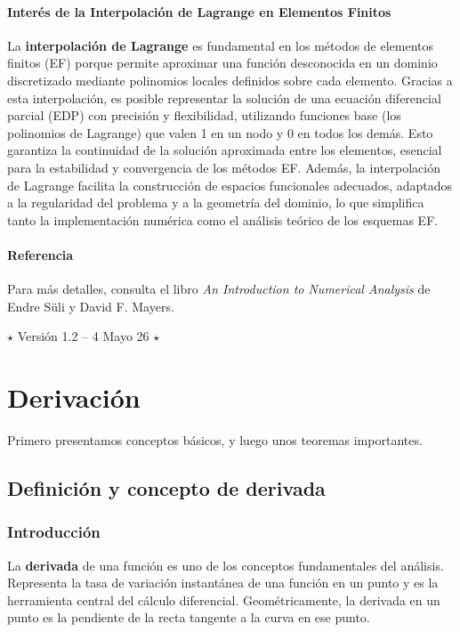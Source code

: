 \documentclass[12pt, a4paper]{article}
\theoremstyle{rioplatense}
\begin{document}
\paragraph{Interés de la Interpolación de Lagrange en Elementos Finitos}
La \textbf{interpolación de Lagrange} es fundamental en los métodos de elementos finitos (EF) porque permite aproximar una función desconocida en un dominio discretizado mediante polinomios locales definidos sobre cada elemento. Gracias a esta interpolación, es posible representar la solución de una ecuación diferencial parcial (EDP) con precisión y flexibilidad, utilizando funciones base (los polinomios de Lagrange) que valen 1 en un nodo y 0 en todos los demás. Esto garantiza la continuidad de la solución aproximada entre los elementos, esencial para la estabilidad y convergencia de los métodos EF. Además, la interpolación de Lagrange facilita la construcción de espacios funcionales adecuados, adaptados a la regularidad del problema y a la geometría del dominio, lo que simplifica tanto la implementación numérica como el análisis teórico de los esquemas EF.

\paragraph{Referencia}
Para más detalles, consulta el libro \emph{An Introduction to Numerical Analysis} de Endre Süli y David F. Mayers.

\begin{center}
$\star$
Versión 1.2 -- 4 Mayo 26
$\star$
\end{center}

\newpage

\section{Derivación}

Primero presentamos conceptos básicos, y luego unos teoremas importantes.

\subsection{Definición y concepto de derivada}
\subsubsection{Introducción}
La \textbf{derivada} de una función es uno de los conceptos fundamentales del análisis. Representa la tasa de variación instantánea de una función en un punto y es la herramienta central del cálculo diferencial. Geométricamente, la derivada en un punto es la pendiente de la recta tangente a la curva en ese punto.
\end{document}
